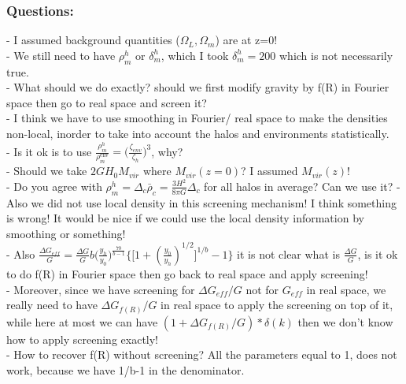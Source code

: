 \documentclass[a4paper,10pt]{article}
\begin{document}
\subsubsection{Questions:}
- I assumed background quantities ($\Omega_L, \Omega_m$) are at z=0!\\
- We still need to have $\rho^h_m$ or $\delta_m^h$, which I took $\delta_m^h=200$ which is not necessarily true. \\
- What should we do exactly? should we first modify gravity by f(R) in Fourier space then go to real space and screen it? \\
- I think we have to use smoothing in Fourier/ real space to make the densities non-local, inorder to take into account the halos and environments statistically. \\
- Is it ok is to use $\frac{\rho_m^h}{\rho_m^{\text{env}}} = \Big( \frac{\zeta_{env}}{\zeta_h} \Big) ^3$, why? \\
- Should we take $ 2 G H_0  M_{vir} $ where $M_{vir} (z=0)$? I assumed $M_{vir}(z)$! \\
- Do you agree with  $\rho_m^h =\Delta_c \bar{\rho}_c = \frac{3 H^2}{8 \pi G } \Delta_c$ for all halos in average? Can we use it?
- Also we did not use local density in this screening mechanism! I think something is wrong! It would be nice if we could use the local density information by smoothing or something! \\
- Also $\frac{\Delta G_{eff}}{G} = \frac{\Delta G}{G} b \Big (\frac{y_h}{y_0} \Big)^{\frac{7b}{b-1}} \Big\{ \big[ 1+ (\frac{y_0}{y_h})^{1/2} \big]^{1/b}  -1 \Big\}
$ it is not clear what is $ \frac{\Delta G}{G}$, is it ok to do f(R) in Fourier space then go back to real space and apply screening! \\
- Moreover, since we have screening for $\Delta G_{eff}/G$ not for $G_{eff}$ in real space, we really need to have  $\Delta G_{f(R)}/G$ in real space to apply the screening on top of it, while here at most we can have $(1+  \Delta G_{f(R)}/G) * \delta(k)$ then we don't know how to apply screening exactly!  \\
- How to recover f(R) without screening? All the parameters equal to 1, does not work, because we have 1/b-1 in the denominator.



%
\end{document}

